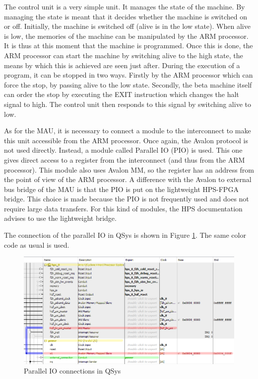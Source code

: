 The control unit is a very simple unit. It manages the state of the machine. By managing the state is meant that 
it decides whether the machine is switched on or off. Initially, the machine is switched off (alive 
is in the low state). When alive is low, the memories of the machine can be manipulated by the ARM 
processor. It is thus at this moment that the machine is programmed. Once this is done, the ARM 
processor can start the machine by switching alive to the high state, the means by which this is 
achieved are seen just after. During the execution of a program, it can be stopped in two ways. 
Firstly by the ARM processor which can force the stop, by passing alive to the low state. Secondly, 
the beta machine itself can order the stop by executing the EXIT instruction which changes the 
halt signal to high. The control unit then responds to this signal by switching alive to low.

As for the MAU, it is necessary to connect a module to the interconnect to make this unit 
accessible from the ARM processor. Once again, the Avalon protocol is not used directly. 
Instead, a module called Parallel IO (PIO) is used. This one gives direct access to a register 
from the interconnect (and thus from the ARM processor). This module also uses Avalon MM, so 
the register has an address from the point of view of the ARM processor. A difference with 
the Avalon to external bus bridge of the MAU is that the PIO is put on the lightweight HPS-FPGA 
bridge. This choice is made because the PIO is not frequently used and does not require large data 
transfers. For this kind of modules, the HPS documentation advises to use the lightweight bridge.

The connection of the parallel IO in QSys is shown in Figure \ref{fig:qsys/ctrlu}. The same color 
code as usual is used.

\begin{figure}[ht!]
    \center
    \includegraphics[width=\linewidth]{"Chapter5-MAU_CTRLU/res/qsys_ctrlu.PNG"}
    \caption{Parallel IO connections in QSys}
    \label{fig:qsys/ctrlu}
\end{figure}

